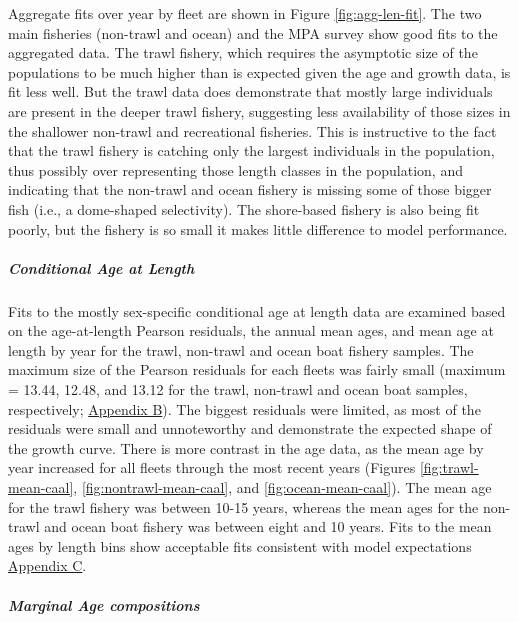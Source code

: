\documentclass[11pt,
  english,
  letterpaper,
]{article}
\begin{document}
Aggregate fits over year by fleet are shown in Figure \ref{fig:agg-len-fit}. The two main fisheries (non-trawl and ocean) and the MPA survey show good fits to the aggregated data. The trawl fishery, which requires the asymptotic size of the populations to be much higher than is expected given the age and growth data, is fit less well. But the trawl data does demonstrate that mostly large individuals are present in the deeper trawl fishery, suggesting less availability of those sizes in the shallower non-trawl and recreational fisheries. This is instructive to the fact that the trawl fishery is catching only the largest individuals in the population, thus possibly over representing those length classes in the population, and indicating that the non-trawl and ocean fishery is missing some of those bigger fish (i.e., a dome-shaped selectivity). The shore-based fishery is also being fit poorly, but the fishery is so small it makes little difference to model performance.

\hypertarget{conditional-age-at-length}{%
\subparagraph{Conditional Age at Length}\label{conditional-age-at-length}}

Fits to the mostly sex-specific conditional age at length data are examined based on the age-at-length Pearson residuals, the annual mean ages, and mean age at length by year for the trawl, non-trawl and ocean boat fishery samples. The maximum size of the Pearson residuals for each fleets was fairly small (maximum = 13.44, 12.48, and 13.12 for the trawl, non-trawl and ocean boat samples, respectively; \protect\hyperlink{app_b}{Appendix B}). The biggest residuals were limited, as most of the residuals were small and unnoteworthy and demonstrate the expected shape of the growth curve. There is more contrast in the age data, as the mean age by year increased for all fleets through the most recent years (Figures \ref{fig:trawl-mean-caal}, \ref{fig:nontrawl-mean-caal}, and \ref{fig:ocean-mean-caal}). The mean age for the trawl fishery was between 10-15 years, whereas the mean ages for the non-trawl and ocean boat fishery was between eight and 10 years. Fits to the mean ages by length bins show acceptable fits consistent with model expectations \protect\hyperlink{app_c}{Appendix C}.

\hypertarget{marginal-age-compositions}{%
\subparagraph{Marginal Age compositions}\label{marginal-age-compositions}}
\end{document}

